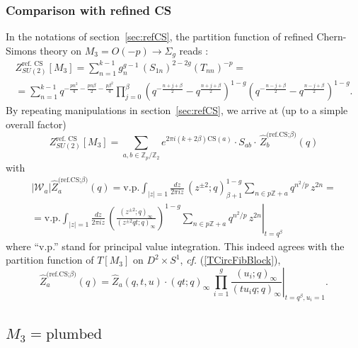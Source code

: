 \documentclass[hyper,letterpaper]{JHEP3}
\newcommand{\Z}{{\mathbb Z}}
\renewcommand{\hat}{\widehat}
\def\CW{{\mathcal W}}
\begin{document}
\subsubsection{Comparison with refined CS}

In the notations of section~\ref{sec:refCS},
the partition function of refined Chern-Simons theory on $M_3=O(-p)\rightarrow \Sigma_g$ reads \cite{Aganagic:2011sg}:
\begin{multline}
	Z_{SU(2)}^\text{ref.~CS}[M_3]=\sum_{n=1}^{k-1} g^{g-1}_n\,(S_{1n})^{2-2g}(T_{nn})^{-p}=\\
	=
	\sum_{n=1}^{k-1}q^{-\frac{pn^2}{4}-\frac{pn\beta}{2}-\frac{p\beta^2}{4}}
	\prod_{j=0}^\beta (q^{-\frac{n+j+\beta}{2}}-q^{\frac{n+j+\beta}{2}})^{1-g}
	(q^{-\frac{n-j+\beta}{2}}-q^{\frac{n-j+\beta}{2}})^{1-g}.
\end{multline}
By repeating manipulations in section~\ref{sec:refCS}, we arrive at (up to a simple overall factor)
\begin{equation}
	Z_{SU(2)}^\text{ref. CS}[M_3]
	=\sum_{a,b\in \Z_p /\Z_2} e^{2\pi i (k+2\beta)\text{CS}(a)}\cdot
	S_{ab}\cdot \,\hat{Z}^\text{(ref.CS;$\beta$)}_b(q)
\end{equation}
with
\begin{multline}
	|\CW_a|\hat{Z}^\text{(ref.CS;$\beta$)}_a(q)=\text{v.p.}\int_{|z|=1}\frac{dz}{2\pi iz}\,(z^{\pm2};q)_{\beta+1}^{1-g}\sum_{n\in p\Z+a}q^{n^2/p}\,z^{2n}=\\
	=\left.\text{v.p.}\int_{|z|=1}\frac{dz}{2\pi iz}\,\left(\frac{(z^{\pm2};q)_\infty}{(z^{\pm2}qt;q)_\infty}\right)^{1-g}\sum_{n\in p\Z+a}q^{n^2/p}\,z^{2n}\right|_{t=q^\beta}
\end{multline}
where ``v.p.'' stand for principal value integration.
This indeed agrees with the partition function of $T[M_3]$ on $D^2\times S^1$, {\it cf.} (\ref{TCircFibBlock}),
\begin{equation}	 \hat{Z}^\text{(ref.CS;$\beta$)}_a(q)=\left.\hat{Z}_a(q,t,u)\cdot(qt;q)_\infty\,\prod_{i=1}^g\frac{(u_i;q)_\infty}{(tu_iq;q)_\infty}\right|_{t=q^\beta,u_i=1}.
\end{equation}


\subsection{${M_3}=\text{plumbed}$}
\label{sec:plumbed}
\end{document}
